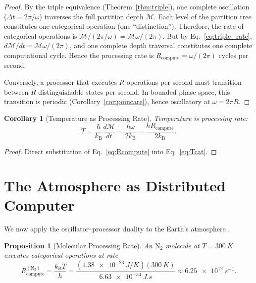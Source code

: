 \documentclass[11pt,twocolumn,a4paper]{article}
\theoremstyle{plain}
\newtheorem{proposition}[theorem]{Proposition}
\newtheorem{corollary}[theorem]{Corollary}
\theoremstyle{definition}
\theoremstyle{remark}
\newcommand{\kB}{k_{\mathrm{B}}}
\newcommand{\Rcompute}{R_{\mathrm{compute}}}
\newcommand{\Depth}{\mathcal{M}}
\begin{document}
\begin{proof}
By the triple equivalence (Theorem~\ref{thm:triple}), one complete oscillation ($\Delta t = 2\pi/\omega$) traverses the full partition depth $\Depth$. Each level of the partition tree constitutes one categorical operation (one ``distinction''). Therefore, the rate of categorical operations is $\Depth/(2\pi/\omega) = \Depth\omega/(2\pi)$. But by Eq.~\eqref{eq:triple_rate}, $d\Depth/dt = \Depth\omega/(2\pi)$, and one complete depth traversal constitutes one complete computational cycle. Hence the processing rate is $\Rcompute = \omega/(2\pi)$ cycles per second.

Conversely, a processor that executes $R$ operations per second must transition between $R$ distinguishable states per second. In bounded phase space, this transition is periodic (Corollary~\ref{cor:poincare}), hence oscillatory at $\omega = 2\pi R$.
\end{proof}

\begin{corollary}[Temperature as Processing Rate]
\label{cor:temp_processing}
Temperature is processing rate:
\begin{equation}
T = \frac{\hbar}{\kB} \frac{d\Depth}{dt} = \frac{\hbar \omega}{2\kB} = \frac{h \Rcompute}{2\kB}.
\label{eq:temp_processing}
\end{equation}
\end{corollary}

\begin{proof}
Direct substitution of Eq.~\eqref{eq:Rcompute} into Eq.~\eqref{eq:Tcat}.
\end{proof}


\section{The Atmosphere as Distributed Computer}
\label{sec:atmosphere_computer}

We now apply the oscillator--processor duality to the Earth's atmosphere \cite{sachikonye2026atmospheric, sachikonye2026architecture}.

\begin{proposition}[Molecular Processing Rate]
\label{prop:molecular_rate}
An $\mathrm{N}_2$ molecule at $T = \SI{300}{K}$ executes categorical operations at rate
\begin{equation}
\Rcompute^{(\mathrm{N}_2)} = \frac{\kB T}{h} = \frac{(\SI{1.38e-23}{J/K})(\SI{300}{K})}{\SI{6.63e-34}{J.s}} \approx \SI{6.25e12}{s^{-1}}.
\label{eq:N2_rate}
\end{equation}
\end{proposition}
\end{document}
